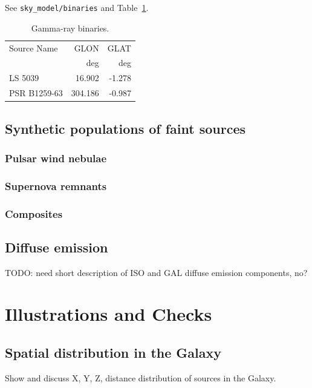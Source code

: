 \documentclass{article}
\begin{document}
See \verb=sky_model/binaries= and Table~\ref{tab:binaries}.

\begin{table}[t]
\caption{
%
Gamma-ray binaries.
%
}
\label{tab:binaries}
\centering
\begin{tabular}{lrr}
\hline
Source Name  & GLON & GLAT \\
             & deg & deg \\
\hline
LS 5039      & 16.902 & -1.278 \\
PSR B1259-63 & 304.186 & -0.987 \\
\hline
\end{tabular}
\end{table}

\subsection{Synthetic populations of faint sources}

\subsubsection{Pulsar wind nebulae}

\subsubsection{Supernova remnants}

\subsubsection{Composites}

\subsection{Diffuse emission}

TODO: need short description of ISO and GAL diffuse emission components, no?

\section{Illustrations and Checks}

\subsection{Spatial distribution in the Galaxy}

Show and discuss X, Y, Z, distance distribution of sources in the Galaxy.
\end{document}
